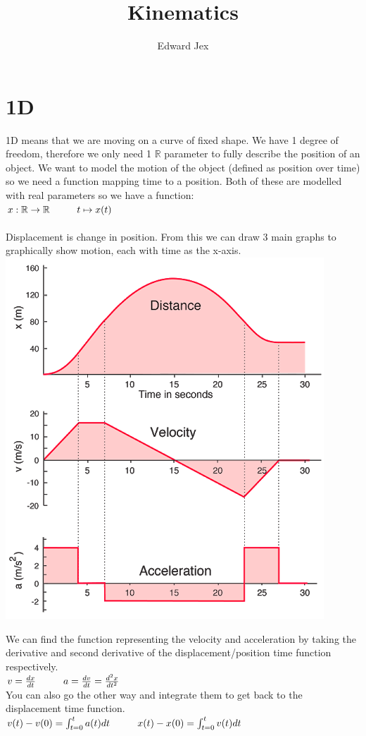 \documentclass[a4paper,12pt]{article}
\begin{document}
\title{Kinematics}	
\author{Edward Jex}
\maketitle
\section*{1D}
1D means that we are moving on a curve of fixed shape. We have 1 degree of freedom, therefore we only need 1 $\mathbb{R}$ parameter to fully describe the position of an object. We want to model the motion of the object (defined as position over time) so we need a function mapping time to a position. Both of these are modelled with real parameters so we have a function: \\
$x: \mathbb{R} \to \mathbb{R} \hspace*{1cm} t \mapsto x(t)$ \\\\

Displacement is change in position. From this we can draw 3 main graphs to graphically show motion, each with time as the x-axis. \\
\includegraphics[scale=0.5]{Graphs1}

We can find the function representing the velocity and acceleration by taking the derivative and second derivative of the displacement/position time function respectively. \\
$v = \frac{dx}{dt} \hspace*{1cm} a = \frac{dv}{dt} = \frac{d^2x}{dt^2}$ \\
You can also go the other way and integrate them to get back to the displacement time function. \\
$v(t) - v(0)= \int_{t=0}^t a(t) dt \hspace*{1cm} x(t) - x(0) = \int_{t=0}^t v(t) dt$ \\\\
\end{document}
